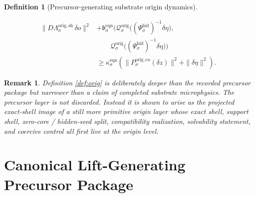 \documentclass[11pt]{article}
\newcommand{\EqnPair}[1]{\mathfrak b_{#1}^{\mathrm{eqn}}}
\newcommand{\HiddenChart}[1]{\Psi_{#1}^{\mathrm{hid}}}
\newcommand{\OrigShellMap}[1]{\Lambda_{#1}^{\mathrm{orig,sh}}}
\newcommand{\OrigCharge}[1]{\mathcal Q_{#1}^{\mathrm{orig}}}
\newcommand{\OrigStateComp}[1]{P_{#1}^{\mathrm{orig,co}}}
\newtheorem{definition}{Definition}
\newtheorem{remark}{Remark}
\begin{document}
\begin{definition}[Precursor-generating substrate origin dynamics]
\begin{enumerate}
\begin{equation}
    \begin{aligned}
    \|D\OrigShellMap{\sigma}\,\delta o\|^{2}
    &+
    \EqnPair{\sigma}\bigl(
    \OrigCharge{\sigma}\bigl((\HiddenChart{\sigma})^{-1}\delta\eta\bigr),\\
    &\qquad
    \OrigCharge{\sigma}\bigl((\HiddenChart{\sigma})^{-1}\delta\eta\bigr)
    \bigr)
    \\
    &\ge
    \kappa_{\sigma}^{\mathrm{eqn}}
    \left(
    \|\OrigStateComp{\sigma}(\delta z)\|^{2}
    +
    \|\delta\eta\|^{2}
    \right).
    \end{aligned}
    \label{eq:origcoercive}
    \end{equation}
\end{enumerate}
\end{definition}

\begin{remark}
Definition \ref{def:orig} is deliberately deeper than the recorded precursor package but narrower than a claim of completed substrate microphysics. The precursor layer is not discarded. Instead it is shown to arise as the projected exact-shell image of a still more primitive origin layer whose exact shell, support shell, zero-core / hidden-seed split, compatibility realization, solvability statement, and coercive control all first live at the origin level.
\end{remark}

\section{Canonical Lift-Generating Precursor Package}
\end{document}
